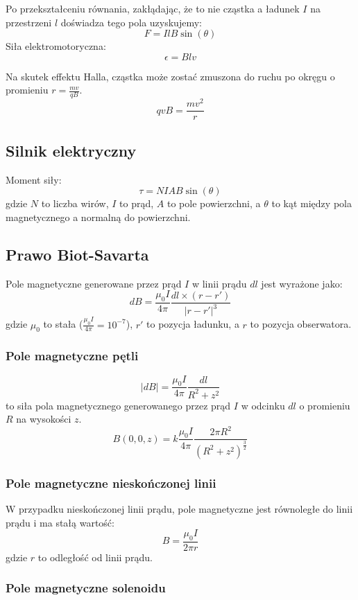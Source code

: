 \documentclass{../notatki}
\begin{document}
Po przekształceniu równania, zakłądając, że to nie cząstka a ładunek $I$ na
przestrzeni $l$ doświadza tego pola uzyskujemy:
$$
F = IlB \sin(\theta)
$$
Siła elektromotoryczna:
$$
\epsilon = Blv
$$

Na skutek effektu Halla, cząstka może zostać zmuszona do ruchu po okręgu
o promieniu $r = \frac{mv}{qB}$.
$$
qvB = \frac{mv^2}{r}
$$

\subsection{Silnik elektryczny}

Moment siły:
$$
\tau = NIAB \sin(\theta)
$$
gdzie $N$ to liczba wirów, $I$ to prąd, $A$ to pole powierzchni, a
$\theta$ to kąt między pola magnetycznego a normalną do powierzchni.

\subsection{Prawo Biot-Savarta}

Pole magnetyczne generowane przez prąd $I$ w linii prądu $dl$ jest
wyrażone jako:
$$
dB = \frac{\mu_0 I}{4 \pi} \frac{dl \times (r - r')}{|r - r'|^3}
$$
gdzie $\mu_0$ to stała ($\frac{\mu_0 I}{4 \pi} = 10^{-7}$), $r'$ to pozycja
ładunku, a $r$ to pozycja obserwatora.

\subsubsection{Pole magnetyczne pętli}

$$
|dB| = \frac{\mu_0 I}{4 \pi} \frac{dl}{R^2 + z^2}
$$
to siła pola magnetycznego generowanego przez prąd $I$ w odcinku $dl$
o promieniu $R$ na wysokości $z$.
$$
B(0, 0, z) = k \frac{\mu_0 I}{4 \pi} \frac{2 \pi R^2}{(R^2 + z^2)^{\frac{3}{2}}}
$$

\subsubsection{Pole magnetyczne nieskończonej linii}

W przypadku nieskończonej linii prądu, pole magnetyczne jest
równoległe do linii prądu i ma stałą wartość:
$$
B = \frac{\mu_0 I}{2 \pi r}
$$
gdzie $r$ to odległość od linii prądu.

\subsubsection{Pole magnetyczne solenoidu}
\end{document}
